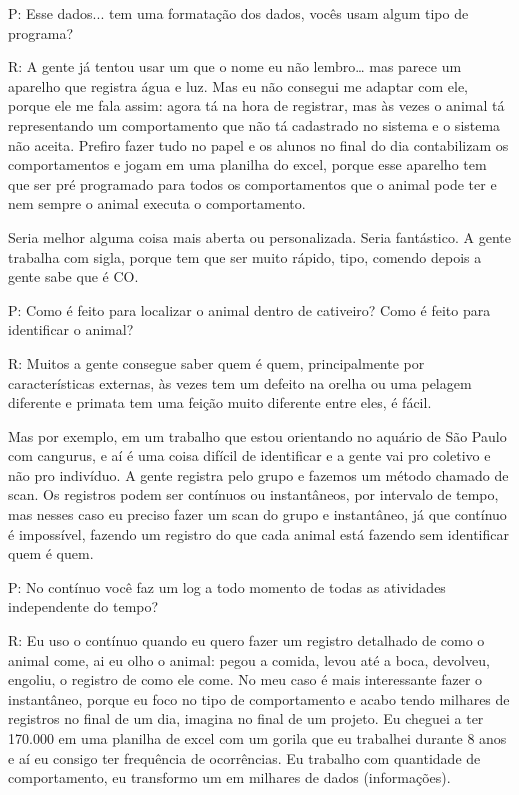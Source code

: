 P: Esse dados... tem uma formatação dos dados, vocês usam algum tipo de programa?

R: A gente já tentou usar um que o nome eu não lembro… mas parece um aparelho que registra água e luz. Mas eu não consegui me adaptar com ele, porque ele me fala assim: agora tá na hora de registrar, mas às vezes o animal tá representando um comportamento que não tá cadastrado no sistema e o sistema não aceita. Prefiro fazer tudo no papel e os alunos no final do dia contabilizam os comportamentos e jogam em uma planilha do excel, porque esse aparelho tem que ser pré programado para todos os comportamentos que o animal pode ter e nem sempre o animal executa o comportamento.

Seria melhor alguma coisa mais aberta ou personalizada. Seria fantástico.
A gente trabalha com sigla, porque tem que ser muito rápido, tipo, comendo depois a gente sabe que é CO.


P: Como é feito para localizar o animal dentro de cativeiro? Como é feito para identificar o animal?

R: Muitos a gente consegue saber quem é quem, principalmente por características externas, às vezes tem um defeito na orelha ou uma pelagem diferente e primata tem uma feição muito diferente entre eles, é fácil.

Mas por exemplo, em um trabalho que estou orientando no aquário de São Paulo com cangurus, e aí é uma coisa difícil de identificar e a gente vai pro coletivo e não pro indivíduo. A gente registra pelo grupo e fazemos um método chamado de scan. Os registros podem ser contínuos ou instantâneos, por intervalo de tempo, mas nesses caso eu preciso fazer um scan do grupo e instantâneo, já que contínuo é impossível, fazendo um registro do que cada animal está fazendo sem identificar quem é quem.


P: No contínuo você faz um log a todo momento de todas as atividades independente do tempo?

R: Eu uso o contínuo quando eu quero fazer um registro detalhado de como o animal come, ai eu olho o animal: pegou a comida, levou até a boca, devolveu, engoliu, o registro de como ele come. No meu caso é mais interessante fazer o instantâneo, porque eu foco no tipo de comportamento e acabo tendo milhares de registros no final de um dia, imagina no final de um projeto. Eu cheguei a ter 170.000 em uma planilha de excel com um gorila que eu trabalhei durante 8 anos e aí eu consigo ter frequência de ocorrências. Eu trabalho com quantidade de comportamento, eu transformo um em milhares de dados (informações).

